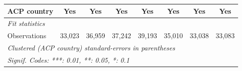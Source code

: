 \begin{tabular}{lccccccc}
   ACP country               & Yes           & Yes                  & Yes            & Yes            & Yes            & Yes             & Yes\\  
   \midrule
   \emph{Fit statistics}\\
   Observations              & 33,023        & 36,959               & 37,242         & 39,193         & 35,010         & 33,038          & 33,083\\  
   \midrule \midrule
   \multicolumn{8}{l}{\emph{Clustered (ACP country) standard-errors in parentheses}}\\
   \multicolumn{8}{l}{\emph{Signif. Codes: ***: 0.01, **: 0.05, *: 0.1}}\\
\end{tabular}
\par\endgroup


